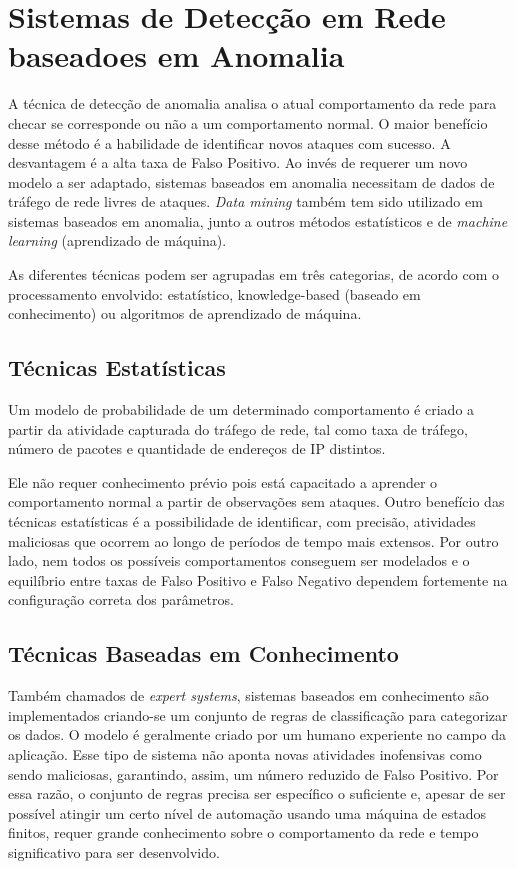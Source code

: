 \chapter{Sistemas de Detecção em Rede baseadoes em Anomalia}
\label{ch:anids}
 A técnica de detecção de anomalia analisa o atual comportamento da rede para checar se corresponde ou não a um
 comportamento normal. O maior benefício desse método é a habilidade de identificar novos ataques com sucesso.
 A desvantagem é a alta taxa de Falso Positivo. Ao invés de requerer um novo modelo a ser adaptado, sistemas baseados
 em anomalia necessitam de dados de tráfego de rede livres de ataques. \textit{Data mining} também tem sido
 utilizado em sistemas baseados em anomalia, junto a outros métodos estatísticos e de \textit{machine learning}
 (aprendizado de máquina).
 \par As diferentes técnicas podem ser agrupadas em três categorias, de acordo com o processamento envolvido:
 estatístico, knowledge-based (baseado em conhecimento) ou algoritmos de aprendizado de máquina.

\section{Técnicas Estatísticas}
Um modelo de probabilidade de um determinado comportamento é criado a partir da atividade capturada do tráfego de rede,
 tal como taxa de tráfego, número de pacotes e quantidade de endereços de IP distintos.
 \par Ele não requer conhecimento prévio pois está capacitado a aprender o comportamento normal a partir de observações
 sem ataques. Outro benefício das técnicas estatísticas é a possibilidade de identificar, com precisão, atividades
 maliciosas que ocorrem ao longo de períodos de tempo mais extensos. Por outro lado, nem todos os possíveis
 comportamentos conseguem ser modelados e o equilíbrio entre taxas de Falso Positivo e Falso Negativo dependem
 fortemente na configuração correta dos parâmetros.

 \section{Técnicas Baseadas em Conhecimento}
 Também chamados de \emph{expert systems}, sistemas baseados em conhecimento são implementados criando-se um conjunto de
 regras de classificação para categorizar os dados. O modelo é geralmente criado por um humano experiente no campo
 da aplicação. Esse tipo de sistema não aponta novas atividades inofensivas como sendo maliciosas, garantindo, assim,
 um número reduzido de Falso Positivo. Por essa razão, o conjunto de regras precisa ser específico o suficiente e,
 apesar de ser possível atingir um certo nível de automação usando uma máquina de estados finitos, requer
 grande conhecimento sobre o comportamento da rede e tempo significativo para ser desenvolvido.

